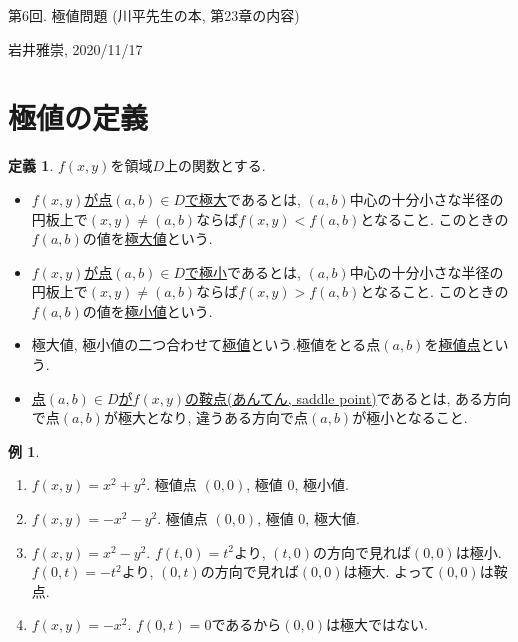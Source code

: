 \documentclass[dvipdfmx,a4paper,11pt]{article}
\theoremstyle{definition}
\newtheorem{dfn}[thm]{定義}
\newtheorem{exa}[thm]{例}
\begin{document}
\begin{center}
{\Large 第6回. 極値問題 (川平先生の本, 第23章の内容)}
\end{center}

\begin{flushright}
 岩井雅崇, 2020/11/17
\end{flushright}

\section{極値の定義}
\begin{tcolorbox}[
    colback = white,
    colframe = green!35!black,
    fonttitle = \bfseries,
    breakable = true]
    \begin{dfn}
    $f(x,y)$を領域$D$上の関数とする.
\begin{itemize}
\item \underline{$f(x,y)$が点$(a,b)\in D$で極大}であるとは, $(a,b)$中心の十分小さな半径の円板上で$(x,y) \neq (a,b)$ならば$f(x,y) < f(a,b)$となること.
このときの$f(a,b)$の値を\underline{極大値}という.
\item \underline{$f(x,y)$が点$(a,b)\in D$で極小}であるとは, $(a,b)$中心の十分小さな半径の円板上で$(x,y) \neq (a,b)$ならば$f(x,y) > f(a,b)$となること.
このときの$f(a,b)$の値を\underline{極小値}という.
\item  極大値, 極小値の二つ合わせて\underline{極値}という.極値をとる点$(a,b)$を\underline{極値点}という.
\item \underline{点$(a,b)\in D$が$f(x,y)$の鞍点(あんてん, saddle point)}であるとは, ある方向で点$(a,b)$が極大となり, 違うある方向で点$(a,b)$が極小となること.
\end{itemize}
    \end{dfn}
    \end{tcolorbox}
    
\begin{exa}
\begin{enumerate}
\item $f(x,y)=x^2 + y^2$. 極値点 $(0,0)$, 極値 0, 極小値.
\item $f(x,y)=-x^2 - y^2$. 極値点 $(0,0)$, 極値 0, 極大値.
\item $f(x,y)=x^2 -y^2$.
$f(t,0) = t^2$より, $(t,0)$の方向で見れば$(0,0)$は極小.
$f(0,t) = -t^2$より, $(0,t)$の方向で見れば$(0,0)$は極大.
よって$(0,0)$は鞍点.
\item $f(x,y)=-x^2 $. $f(0,t) =0$であるから$(0,0)$は極大ではない. 
\end{enumerate}

\end{exa}
\end{document}
